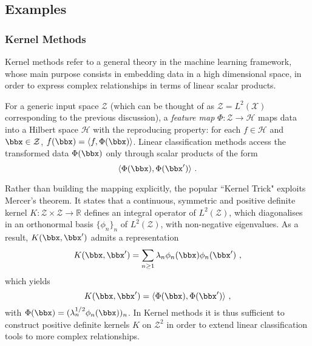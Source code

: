 \subsection{Examples}
\label{sec:geomexamples}

\subsubsection{Kernel Methods}
\label{kernelmethods}

Kernel methods refer to a general
theory in the machine learning framework,
whose main purpose consists in
embedding data in a high dimensional space,
in order to express complex relationships 
in terms of linear scalar products. 

For a generic input space $\mathcal{Z}$ (which 
can be thought of as $\mathcal{Z} = L^2(\mathcal{X})$ 
corresponding to the previous discussion),  
a \emph{feature map}
$\Phi: \mathcal{Z} \longrightarrow \mathcal{H}$ maps 
data into a Hilbert space $\mathcal{H}$ with 
the reproducing property: for each $f \in \mathcal{H}$ and
$\bbx \in \mathcal{Z}$, $f(\bbx) = \langle f, \Phi(\bbx) \rangle$.
Linear classification methods access the 
transformed data $\Phi(\bbx)$ only through 
scalar products of the form \cite{kernel_methods}
$$\langle \Phi(\bbx), \Phi(\bbx') \rangle~.$$

Rather than building the mapping 
explicitly,
the popular ``Kernel Trick" exploits 
Mercer's theorem. It states that a continuous,
symmetric and positive
definite kernel $K: \mathcal{Z} \times \mathcal{Z} \to \mathbb{R}$ 
defines an integral
operator of
$L^2(\mathcal{Z})$, which diagonalises in an orthonormal
basis \cite{mercer_theorem} $\{\phi_n\}_n$ of
$L^2(\mathcal{Z})$, with non-negative
eigenvalues. As a result, $K(\bbx,\bbx')$ admits 
a representation
$$K(\bbx,\bbx') = \sum_{n\geq 1} \lambda_n \phi_n(\bbx)\phi_n(\bbx')~,$$
which yields
$$K(\bbx,\bbx') = \langle \Phi(\bbx), \Phi(\bbx') \rangle~,$$
with $\Phi(\bbx)=(\lambda_n^{1/2} \phi_n(\bbx)  )_n$.
In Kernel methods 
it is thus sufficient 
to construct positive definite kernels $K$ on $\mathcal{Z}^2$
in order to extend linear classification tools
to more complex relationships.

